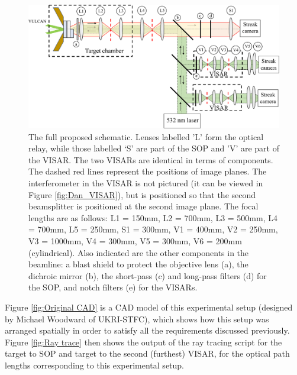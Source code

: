 \begin{figure}
	\centering
\includegraphics[width=1.0\textwidth]{figures/Experiment/Full Experiment Schematic.pdf}%
\caption{\label{fig:Full experiment schematic} The full proposed schematic. Lenses labelled 'L' form the optical relay, while those labelled `S' are part of the SOP and 'V' are part of the VISAR. The two VISARs are identical in terms of components. The dashed red lines represent the positions of image planes. The interferometer in the VISAR is not pictured (it can be viewed in Figure \ref{fig:Dan_VISAR}), but is positioned so that the second beamsplitter is positioned at the second image plane. The focal lengths are as follows: L1 = 150mm, L2 = 700mm, L3 = 500mm, L4 = 700mm, L5 = 250mm, S1 = 300mm, V1 = 400mm, V2 = 250mm, V3 = 1000mm, V4 = 300mm, V5 = 300mm, V6 = 200mm (cylindrical). Also indicated are the other components in the beamline: a blast shield to protect the objective lens (a), the dichroic mirror (b), the short-pass (c) and long-pass filters (d) for the SOP, and notch filters (e) for the VISARs.}
\end{figure}

Figure \ref{fig:Original CAD} is a CAD model of this experimental setup (designed by Michael Woodward of UKRI-STFC), which shows how this setup was arranged spatially in order to satisfy all the requirements discussed previously. Figure \ref{fig:Ray trace} then shows the output of the ray tracing script for the target to SOP and target to the second (furthest) VISAR, for the optical path lengths corresponding to this experimental setup. 


